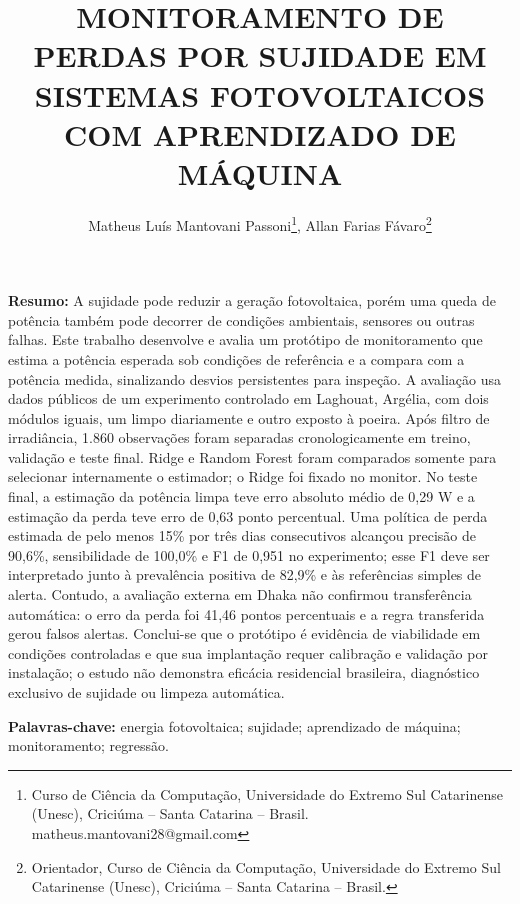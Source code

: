 \documentclass{UNESC}
\title{MONITORAMENTO DE PERDAS POR SUJIDADE EM SISTEMAS FOTOVOLTAICOS COM APRENDIZADO DE MÁQUINA}
\author{Matheus Luís Mantovani Passoni\footnote{Curso de Ciência da Computação, Universidade do Extremo Sul Catarinense (Unesc), Criciúma -- Santa Catarina -- Brasil. matheus.mantovani28@gmail.com},
Allan Farias Fávaro\footnote{Orientador, Curso de Ciência da Computação, Universidade do Extremo Sul Catarinense (Unesc), Criciúma -- Santa Catarina -- Brasil.}}
\begin{document}
\onehalfspacing
\maketitle

\noindent\textbf{Resumo:} A sujidade pode reduzir a geração fotovoltaica, porém uma queda de potência também pode decorrer de condições ambientais, sensores ou outras falhas. Este trabalho desenvolve e avalia um protótipo de monitoramento que estima a potência esperada sob condições de referência e a compara com a potência medida, sinalizando desvios persistentes para inspeção. A avaliação usa dados públicos de um experimento controlado em Laghouat, Argélia, com dois módulos iguais, um limpo diariamente e outro exposto à poeira. Após filtro de irradiância, 1.860 observações foram separadas cronologicamente em treino, validação e teste final. Ridge e Random Forest foram comparados somente para selecionar internamente o estimador; o Ridge foi fixado no monitor. No teste final, a estimação da potência limpa teve erro absoluto médio de 0,29 W e a estimação da perda teve erro de 0,63 ponto percentual. Uma política de perda estimada de pelo menos 15\% por três dias consecutivos alcançou precisão de 90,6\%, sensibilidade de 100,0\% e F1 de 0,951 no experimento; esse F1 deve ser interpretado junto à prevalência positiva de 82,9\% e às referências simples de alerta. Contudo, a avaliação externa em Dhaka não confirmou transferência automática: o erro da perda foi 41,46 pontos percentuais e a regra transferida gerou falsos alertas. Conclui-se que o protótipo é evidência de viabilidade em condições controladas e que sua implantação requer calibração e validação por instalação; o estudo não demonstra eficácia residencial brasileira, diagnóstico exclusivo de sujidade ou limpeza automática.

\vspace{0.5em}
\noindent\textbf{Palavras-chave:} energia fotovoltaica; sujidade; aprendizado de máquina; monitoramento; regressão.
\end{document}
